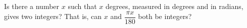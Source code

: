 Is there a number $x$ such that $x$ degrees, measured in degrees and in radians, gives two integers? That is, can $x$ and $\dfrac{\pi x}{180}$ both be integers?
